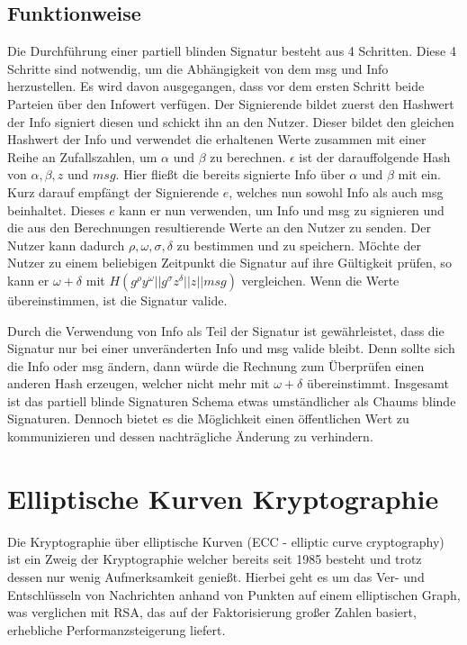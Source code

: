\documentclass{scrreprt}
\begin{document}
\subsection{Funktionweise}


Die Durchführung einer partiell blinden Signatur besteht aus 4 Schritten. Diese 4 Schritte sind notwendig, um die Abhängigkeit von dem msg und Info herzustellen. Es wird davon ausgegangen, dass vor dem ersten Schritt beide Parteien über den Infowert verfügen. Der Signierende bildet zuerst den Hashwert der Info signiert diesen und schickt ihn an den Nutzer. Dieser bildet den gleichen Hashwert der Info und verwendet die erhaltenen Werte zusammen mit einer Reihe an Zufallszahlen, um $\alpha$ und $\beta$ zu berechnen. $\epsilon$ ist der darauffolgende Hash von $\alpha,\beta,z$ und $msg$. Hier fließt die bereits signierte Info über $\alpha$ und $\beta$ mit ein. Kurz darauf empfängt der Signierende $e$, welches nun sowohl Info als auch msg beinhaltet. Dieses $e$ kann er nun verwenden, um Info und msg zu signieren und die aus den Berechnungen resultierende Werte an den Nutzer zu senden. Der Nutzer kann dadurch $\rho,\omega,\sigma ,\delta$ zu bestimmen und zu speichern. Möchte der Nutzer zu einem beliebigen Zeitpunkt die Signatur auf ihre Gültigkeit prüfen, so kann er $\omega + \delta$ mit  $H (g^\rho y^\omega || g^\sigma z^\delta || z || msg)$ vergleichen. Wenn die Werte übereinstimmen, ist die Signatur valide.

Durch die Verwendung von Info als Teil der Signatur ist gewährleistet, dass die Signatur nur bei einer unveränderten Info und msg valide bleibt. Denn sollte sich die Info oder msg ändern, dann würde die Rechnung zum Überprüfen einen anderen Hash erzeugen, welcher nicht mehr mit $\omega+\delta$ übereinstimmt. Insgesamt ist das partiell blinde Signaturen Schema etwas umständlicher als Chaums blinde Signaturen. Dennoch bietet es die Möglichkeit einen öffentlichen Wert zu kommunizieren und dessen nachträgliche Änderung zu verhindern.


\section{Elliptische Kurven Kryptographie}
\label{sec:ecc}
Die Kryptographie über elliptische Kurven (ECC - elliptic curve cryptography) ist ein Zweig der Kryptographie welcher bereits seit 1985 besteht \cite{ecc-miller1985use} und trotz dessen nur wenig Aufmerksamkeit genießt. Hierbei geht es um das Ver- und Entschlüsseln von Nachrichten anhand von Punkten auf einem elliptischen Graph, was verglichen mit RSA, das auf der Faktorisierung großer Zahlen basiert, erhebliche Performanzsteigerung liefert.
\end{document}
